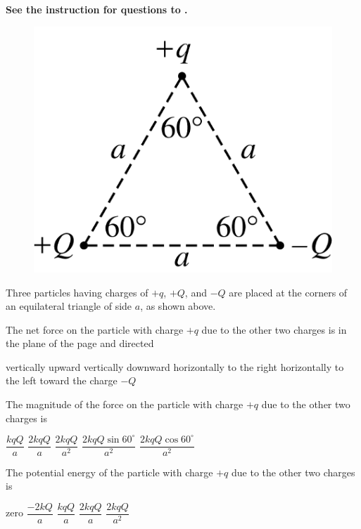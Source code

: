 \textbf{See the instruction for questions  to .}

\begin{figure}[H]
    \center
    \includegraphics[scale=0.25]{images/img-002-004.png}
\end{figure}

Three particles having charges of $+q$, $+Q$, and $-Q$ are placed at the corners of an equilateral triangle of side $a$, as shown above.

\begin{questions}\setcounter{question}{1}\question
The net force on the particle with charge $+q$ due to the other two charges is in the plane of the page and directed

\begin{choices}
\choice vertically upward
\choice vertically downward
\choice horizontally to the right
\choice horizontally to the left
\choice toward the charge $-Q$
\end{choices}\end{questions}

\begin{questions}\setcounter{question}{2}\question
The magnitude of the force on the particle with charge $+q$ due to the other two charges is

\begin{oneparchoices}
\choice $\dfrac{k q Q}{a}$
\choice $\dfrac{2 k q Q}{a}$
\choice $\dfrac{2 k q Q}{a^{2}}$
\choice $\dfrac{2 k q Q \sin 60^{\circ}}{a^{2}}$
\choice $\dfrac{2 k q Q \cos 60^{\circ}}{a^{2}}$
\end{oneparchoices}\end{questions}

\begin{questions}\setcounter{question}{3}\question
The potential energy of the particle with charge $+q$ due to the other two charges is

\begin{oneparchoices}
\choice zero
\choice $\dfrac{-2 k Q}{a} $
\choice $\dfrac{k q Q}{a} $
\choice $\dfrac{2 k q Q}{a}$
\choice $\dfrac{2 k q Q}{a^{2}}$
\end{oneparchoices}\end{questions}

